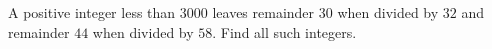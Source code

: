 A positive integer less than $3000$ leaves remainder $30$ when divided by $32$ and remainder $44$ when divided by $58$. Find all such integers.
